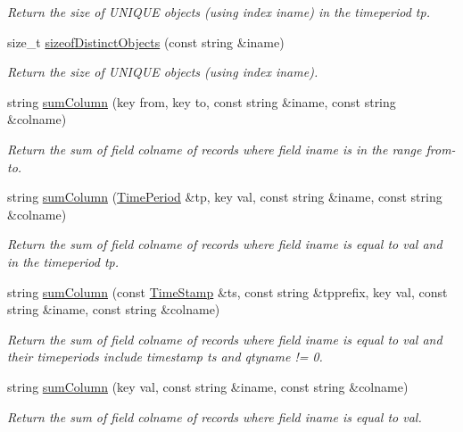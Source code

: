 \begin{CompactItemize}
\begin{CompactList}\small\item\em Return the size of UNIQUE objects (using index iname) in the timeperiod tp.\item\end{CompactList}\item 
size\_\-t \hyperlink{classSQLTable_SQLTablea31}{sizeof\-Distinct\-Objects} (const string \&iname)
\begin{CompactList}\small\item\em Return the size of UNIQUE objects (using index iname).\item\end{CompactList}\item 
string \hyperlink{classSQLTable_SQLTablea32}{sum\-Column} (key from, key to, const string \&iname, const string \&colname)
\begin{CompactList}\small\item\em Return the sum of field colname of records where field iname is in the range from-to.\item\end{CompactList}\item 
string \hyperlink{classSQLTable_SQLTablea33}{sum\-Column} (\hyperlink{classTimePeriod}{Time\-Period} \&tp, key val, const string \&iname, const string \&colname)
\begin{CompactList}\small\item\em Return the sum of field colname of records where field iname is equal to val and in the timeperiod tp.\item\end{CompactList}\item 
string \hyperlink{classSQLTable_SQLTablea34}{sum\-Column} (const \hyperlink{classTimeStamp}{Time\-Stamp} \&ts, const string \&tpprefix, key val, const string \&iname, const string \&colname)
\begin{CompactList}\small\item\em Return the sum of field colname of records where field iname is equal to val and their timeperiods include timestamp ts and qtyname != 0.\item\end{CompactList}\item 
string \hyperlink{classSQLTable_SQLTablea35}{sum\-Column} (key val, const string \&iname, const string \&colname)
\begin{CompactList}\small\item\em Return the sum of field colname of records where field iname is equal to val.\item\end{CompactList}\item 

\end{CompactItemize}
